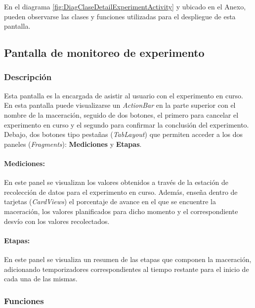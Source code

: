             \par En el diagrama \ref{fig:DiagClaseDetailExperimentActivity} y ubicado en el Anexo, pueden observarse las clases y funciones utilizadas para el despliegue de esta pantalla.
            
            
        \subsection{Pantalla de monitoreo de experimento}
        \label{DescripPantallaMonitoreoExperimento}
            \subsubsection{Descripción}
            Esta pantalla es la encargada de asistir al usuario con el experimento en curso.
            En esta pantalla puede visualizarse un \textit{ActionBar} en la parte superior con el nombre de la maceración, seguido de dos botones, el primero para cancelar el experimento en curso y el segundo para confirmar la conclusión del experimento. Debajo, dos botones tipo pestañas (\textit{TabLayout}) que permiten acceder a los dos paneles (\textit{Fragments}): \textbf{Mediciones} y \textbf{Etapas}.
            
            \paragraph{Mediciones:}
            En este panel se visualizan los valores obtenidos a través de la estación de recolección de datos para el experimento en curso. Además, enseña dentro de tarjetas (\textit{CardViews}) el porcentaje de avance en el que se encuentre la maceración, los valores planificados para dicho momento y el correspondiente desvío con los valores recolectados.
            \paragraph{Etapas:}
            En este panel se visualiza un resumen de las etapas que componen la maceración, adicionando temporizadores correspondientes al tiempo restante para el inicio de cada una de las mismas.
            
            \subsubsection{Funciones}
            
